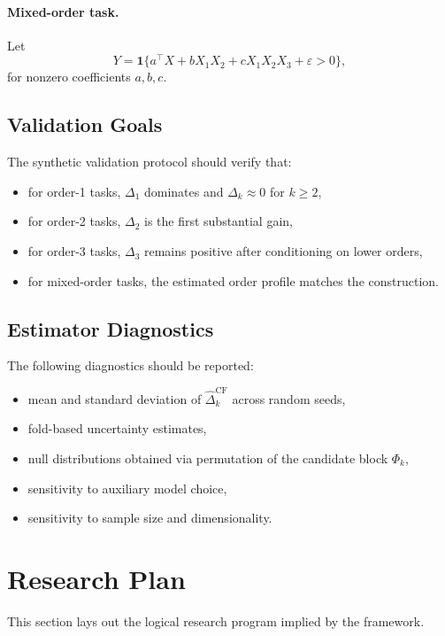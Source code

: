 \documentclass[11pt]{article}
\newcommand{\1}{\mathbf{1}}
\begin{document}
\paragraph{Mixed-order task.}
Let
\[
Y = \1\{a^\top X + b X_1 X_2 + c X_1 X_2 X_3 + \varepsilon > 0\},
\]
for nonzero coefficients $a,b,c$.

\subsection{Validation Goals}

The synthetic validation protocol should verify that:
\begin{itemize}[leftmargin=1.5em]
    \item for order-1 tasks, $\Delta_1$ dominates and $\Delta_k \approx 0$ for $k \ge 2$,
    \item for order-2 tasks, $\Delta_2$ is the first substantial gain,
    \item for order-3 tasks, $\Delta_3$ remains positive after conditioning on lower orders,
    \item for mixed-order tasks, the estimated order profile matches the construction.
\end{itemize}

\subsection{Estimator Diagnostics}

The following diagnostics should be reported:
\begin{itemize}[leftmargin=1.5em]
    \item mean and standard deviation of $\widehat{\Delta}_k^{\mathrm{CF}}$ across random seeds,
    \item fold-based uncertainty estimates,
    \item null distributions obtained via permutation of the candidate block $\Phi_k$,
    \item sensitivity to auxiliary model choice,
    \item sensitivity to sample size and dimensionality.
\end{itemize}

\section{Research Plan}

This section lays out the logical research program implied by the framework.
\end{document}
